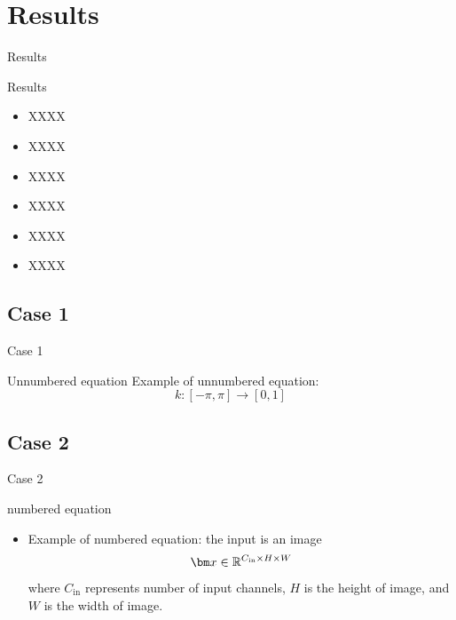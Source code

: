\documentclass{beamer}
\begin{document}
\section{Results}

\begin{frame}{Results}
  \begin{block}{Results}
    \begin{itemize}
      \setlength{\itemsep}{6pt}
      \item XXXX
      \item XXXX
      \item XXXX
      \item XXXX
      \item XXXX
      \item XXXX
    \end{itemize}
  \end{block}
\end{frame}

\subsection{Case 1}

\begin{frame}{Case 1}
  \begin{block}{Unnumbered equation}
    Example of unnumbered equation:
    $$
      k:[-\pi,\pi] \rightarrow [0,1]
    $$
  \end{block}
\end{frame}

\subsection{Case 2}

\begin{frame}{Case 2}
  \begin{block}{numbered equation}
    \begin{itemize}
      \item Example of numbered equation: the input is an image
      \begin{equation}
        \vx\in\reals^{C_{\text{in}}\times H\times W}
      \end{equation}
      where $C_{\text{in}}$ represents number of input channels, $H$ is the height of image, and $W$ is the width of image.
    \end{itemize}
  \end{block}
\end{frame}
\end{document}
